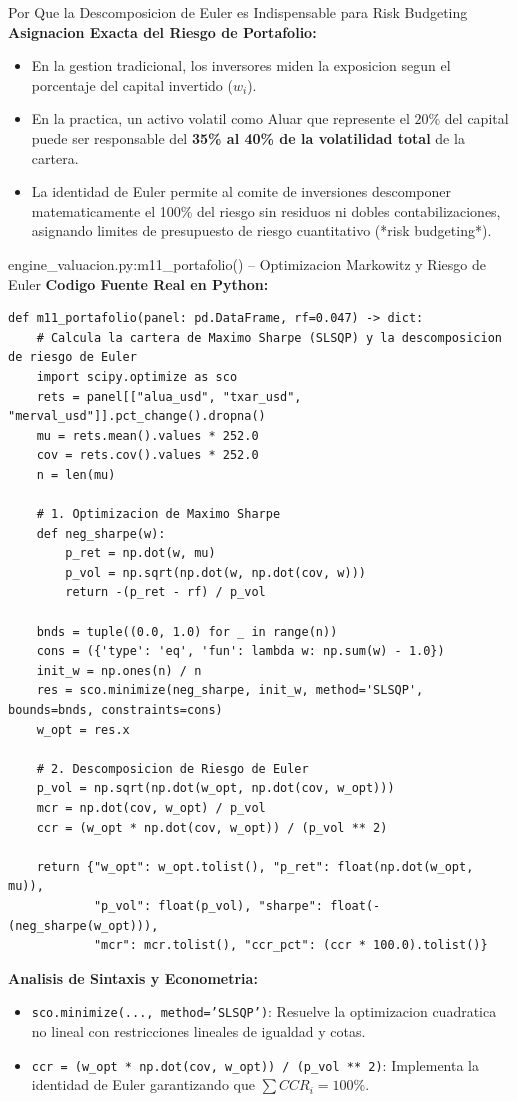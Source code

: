 \documentclass[10pt,a4paper]{article}
\theoremstyle{definition}
\begin{document}
\begin{conceptbox}{Por Que la Descomposicion de Euler es Indispensable para Risk Budgeting}
\textbf{Asignacion Exacta del Riesgo de Portafolio:}
\begin{itemize}
    \item En la gestion tradicional, los inversores miden la exposicion segun el porcentaje del capital invertido ($w_i$).
    \item En la practica, un activo volatil como Aluar que represente el $20\%$ del capital puede ser responsable del \textbf{35\% al 40\% de la volatilidad total} de la cartera.
    \item La identidad de Euler permite al comite de inversiones descomponer matematicamente el 100\% del riesgo sin residuos ni dobles contabilizaciones, asignando limites de presupuesto de riesgo cuantitativo (*risk budgeting*).
\end{itemize}
\end{conceptbox}

\begin{codebox}{{engine\_valuacion.py:m11\_portafolio() -- Optimizacion Markowitz y Riesgo de Euler}}
\textbf{Codigo Fuente Real en Python:}
\begin{verbatim}
def m11_portafolio(panel: pd.DataFrame, rf=0.047) -> dict:
    # Calcula la cartera de Maximo Sharpe (SLSQP) y la descomposicion de riesgo de Euler
    import scipy.optimize as sco
    rets = panel[["alua_usd", "txar_usd", "merval_usd"]].pct_change().dropna()
    mu = rets.mean().values * 252.0
    cov = rets.cov().values * 252.0
    n = len(mu)
    
    # 1. Optimizacion de Maximo Sharpe
    def neg_sharpe(w):
        p_ret = np.dot(w, mu)
        p_vol = np.sqrt(np.dot(w, np.dot(cov, w)))
        return -(p_ret - rf) / p_vol
    
    bnds = tuple((0.0, 1.0) for _ in range(n))
    cons = ({'type': 'eq', 'fun': lambda w: np.sum(w) - 1.0})
    init_w = np.ones(n) / n
    res = sco.minimize(neg_sharpe, init_w, method='SLSQP', bounds=bnds, constraints=cons)
    w_opt = res.x
    
    # 2. Descomposicion de Riesgo de Euler
    p_vol = np.sqrt(np.dot(w_opt, np.dot(cov, w_opt)))
    mcr = np.dot(cov, w_opt) / p_vol
    ccr = (w_opt * np.dot(cov, w_opt)) / (p_vol ** 2)
    
    return {"w_opt": w_opt.tolist(), "p_ret": float(np.dot(w_opt, mu)),
            "p_vol": float(p_vol), "sharpe": float(-(neg_sharpe(w_opt))),
            "mcr": mcr.tolist(), "ccr_pct": (ccr * 100.0).tolist()}
\end{verbatim}
\textbf{Analisis de Sintaxis y Econometria:}
\begin{itemize}
    \item \texttt{sco.minimize(..., method='SLSQP')}: Resuelve la optimizacion cuadratica no lineal con restricciones lineales de igualdad y cotas.
    \item \texttt{ccr = (w\_opt * np.dot(cov, w\_opt)) / (p\_vol ** 2)}: Implementa la identidad de Euler garantizando que $\sum CCR_i = 100\%$.
\end{itemize}
\end{codebox}
\clearpage
\end{document}
